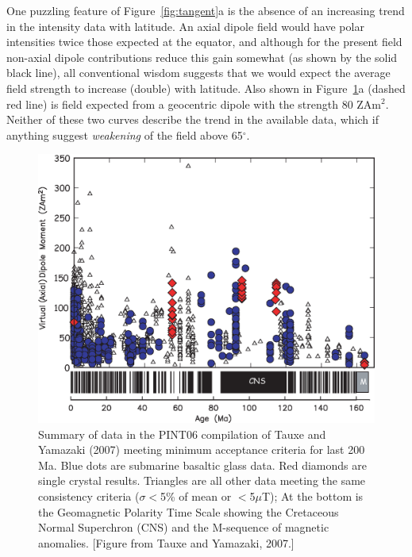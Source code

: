 One puzzling feature of Figure~\ref{fig:tangent}a is the absence of an increasing trend in the intensity data with latitude. An axial dipole field would have polar intensities twice those expected at the equator, and although for the present field non-axial dipole contributions reduce this gain somewhat (as shown by the solid black line), all conventional wisdom suggests that we would expect the average field strength to increase (double) with latitude. Also shown in Figure~\ref{fig:pint}a (dashed red line)  is field expected from a geocentric dipole with the strength 80 ZAm$^2$.  Neither of these two curves describe the trend in the available data, which if anything suggest {\it weakening} of the field above 65$^{\circ}$.  


\begin{figure}[h!tb]
\centering  \includegraphics[width=12.5 cm]{EPSfiles/sbg-lava.eps}
\caption{Summary of data  in the PINT06 compilation of Tauxe and Yamazaki (2007) meeting minimum acceptance criteria for last 200 Ma.  Blue dots are submarine basaltic glass data.   Red diamonds are single crystal results.  Triangles are all other data meeting the same consistency criteria ($\sigma < $5\% of mean or $<$5$\mu$T);    At the bottom is the Geomagnetic
Polarity Time Scale showing the Cretaceous Normal Superchron (CNS) and the M-sequence of magnetic anomalies. [Figure from Tauxe and Yamazaki, 2007.]}
\label{fig:pint}
\end{figure}



